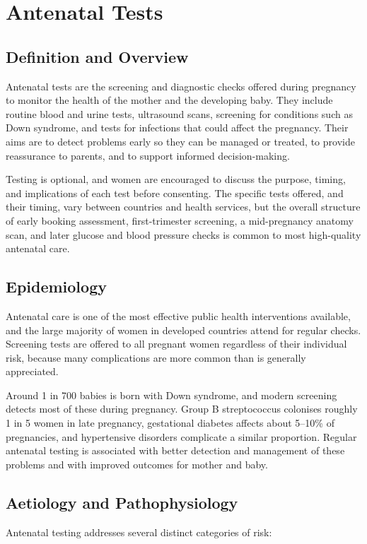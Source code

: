 \chapter{Antenatal Tests}

\section*{Definition and Overview}
Antenatal tests are the screening and diagnostic checks offered during pregnancy to monitor the health of the mother and the developing baby. They include routine blood and urine tests, ultrasound scans, screening for conditions such as Down syndrome, and tests for infections that could affect the pregnancy. Their aims are to detect problems early so they can be managed or treated, to provide reassurance to parents, and to support informed decision-making.

Testing is optional, and women are encouraged to discuss the purpose, timing, and implications of each test before consenting. The specific tests offered, and their timing, vary between countries and health services, but the overall structure of early booking assessment, first-trimester screening, a mid-pregnancy anatomy scan, and later glucose and blood pressure checks is common to most high-quality antenatal care.

\section*{Epidemiology}
Antenatal care is one of the most effective public health interventions available, and the large majority of women in developed countries attend for regular checks. Screening tests are offered to all pregnant women regardless of their individual risk, because many complications are more common than is generally appreciated.

Around 1 in 700 babies is born with Down syndrome, and modern screening detects most of these during pregnancy. Group B streptococcus colonises roughly 1 in 5 women in late pregnancy, gestational diabetes affects about 5--10\% of pregnancies, and hypertensive disorders complicate a similar proportion. Regular antenatal testing is associated with better detection and management of these problems and with improved outcomes for mother and baby.

\section*{Aetiology and Pathophysiology}
Antenatal testing addresses several distinct categories of risk:

